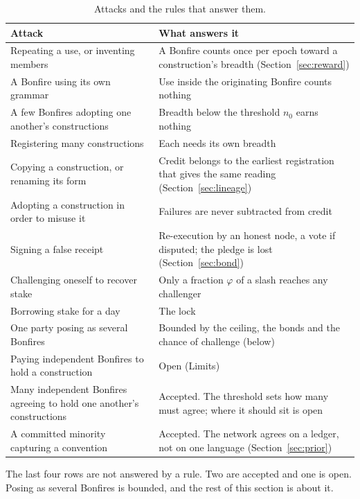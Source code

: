 \begin{table}[!htb]
\centering\small
\begin{tabularx}{\textwidth}{@{}p{}X@{}}
\toprule
\textbf{Attack} & \textbf{What answers it} \\
\midrule
Repeating a use, or inventing members & A Bonfire counts once per epoch toward a construction's breadth
(Section~\ref{sec:reward}) \\
A Bonfire using its own grammar & Use inside the originating Bonfire counts nothing \\
A few Bonfires adopting one another's constructions & Breadth below the threshold $n_0$ earns nothing \\
Registering many constructions & Each needs its own breadth \\
Copying a construction, or renaming its form & Credit belongs to the earliest registration that gives the same
reading (Section~\ref{sec:lineage}) \\
Adopting a construction in order to misuse it & Failures are never subtracted from credit \\
Signing a false receipt & Re-execution by an honest node, a vote if disputed; the pledge is lost
(Section~\ref{sec:bond}) \\
Challenging oneself to recover stake & Only a fraction $\varphi$ of a slash reaches any challenger \\
Borrowing stake for a day & The lock \\
One party posing as several Bonfires & Bounded by the ceiling, the bonds and the chance of challenge (below) \\
Paying independent Bonfires to hold a construction & Open (Limits) \\
Many independent Bonfires agreeing to hold one another's constructions & Accepted. The threshold sets how many must agree; where it should sit is open \\
A committed minority capturing a convention & Accepted. The network agrees on a ledger, not on one language
(Section~\ref{sec:prior}) \\
\bottomrule
\end{tabularx}
\caption{Attacks and the rules that answer them.}\label{tab:attacks}
\end{table}

The last four rows are not answered by a rule. Two are accepted and one is open. Posing as several Bonfires is
bounded, and the rest of this section is about it.

